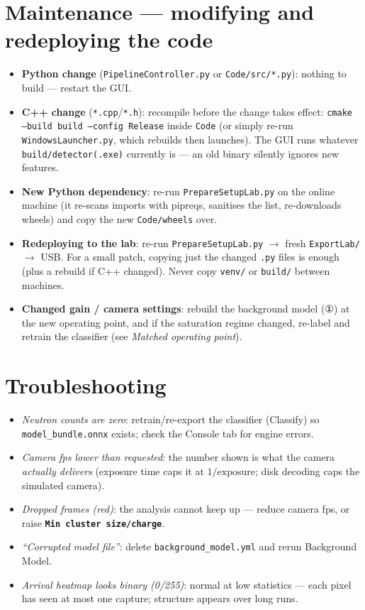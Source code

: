 \documentclass[11pt,a4paper]{article}
\newcommand{\param}[1]{\texttt{\textbf{#1}}}
\newcommand{\gui}[1]{\textsf{#1}}
\begin{document}
\section{Maintenance --- modifying and redeploying the code}
\begin{itemize}
  \item \textbf{Python change} (\texttt{PipelineController.py} or
        \texttt{Code/src/*.py}): nothing to build --- restart the GUI.
  \item \textbf{C++ change} (\texttt{*.cpp}/\texttt{*.h}): recompile before
        the change takes effect:
        \texttt{cmake --build build --config Release} inside \texttt{Code}
        (or simply re-run \texttt{WindowsLauncher.py}, which rebuilds then
        launches). The GUI runs whatever \texttt{build/detector(.exe)}
        currently is --- an old binary silently ignores new features.
  \item \textbf{New Python dependency}: re-run \texttt{PrepareSetupLab.py}
        on the online machine (it re-scans imports with pipreqs, sanitises
        the list, re-downloads wheels) and copy the new
        \texttt{Code/wheels} over.
  \item \textbf{Redeploying to the lab}: re-run \texttt{PrepareSetupLab.py}
        $\rightarrow$ fresh \texttt{ExportLab/} $\rightarrow$ USB. For a
        small patch, copying just the changed \texttt{.py} files is enough
        (plus a rebuild if C++ changed). Never copy \texttt{venv/} or
        \texttt{build/} between machines.
  \item \textbf{Changed gain / camera settings}: rebuild the background
        model (①) at the new operating point, and if the saturation regime
        changed, re-label and retrain the classifier (see \emph{Matched
        operating point}).
\end{itemize}

\section{Troubleshooting}
\begin{itemize}
  \item \emph{Neutron counts are zero}: retrain/re-export the classifier
        (\gui{Classify}) so \texttt{model\_bundle.onnx} exists; check the
        Console tab for engine errors.
  \item \emph{Camera fps lower than requested}: the number shown is what the
        camera \emph{actually delivers} (exposure time caps it at
        $1/\mathrm{exposure}$; disk decoding caps the simulated camera).
  \item \emph{Dropped frames (red)}: the analysis cannot keep up --- reduce
        camera fps, or raise \param{Min cluster size/charge}.
  \item \emph{``Corrupted model file''}: delete
        \texttt{background\_model.yml} and rerun \gui{Background Model}.
  \item \emph{Arrival heatmap looks binary (0/255)}: normal at low
        statistics --- each pixel has seen at most one capture; structure
        appears over long runs.
\end{itemize}
\end{document}
